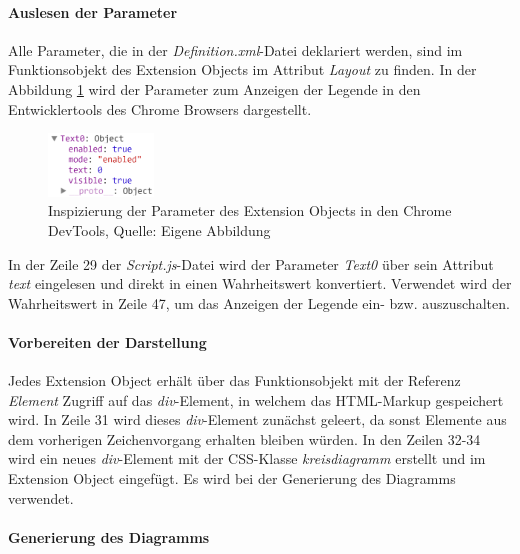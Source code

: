 

\paragraph{Auslesen der Parameter}

Alle Parameter, die in der \textit{Definition.xml}-Datei deklariert werden, sind im Funktionsobjekt des Extension Objects im Attribut \textit{Layout} zu finden. In der Abbildung \ref{fig:InspectLayoutParams} wird der Parameter zum Anzeigen der Legende in den Entwicklertools des Chrome Browsers dargestellt.

\ifIncludeFigures\begin{figure}[htbp]
	\centering
		\includegraphics[width=0.25\textwidth]{./img/DevTools/LayoutParams.png}
	\caption[Inspizierung der Parameter des Extension Objects in den Chrome DevTools]{Inspizierung der Parameter des Extension Objects in den Chrome DevTools, Quelle: Eigene Abbildung}
	\label{fig:InspectLayoutParams}
\end{figure}\fi

In der Zeile 29 der \textit{Script.js}-Datei wird der Parameter \textit{Text0} über sein Attribut \textit{text} eingelesen und direkt in einen Wahrheits\-wert konvertiert. Verwendet wird der Wahrheits\-wert in Zeile 47, um das Anzeigen der Legende ein- bzw. auszuschalten.


\paragraph{Vorbereiten der Darstellung}

Jedes Extension Object erhält über das Funktionsobjekt mit der Referenz \textit{Element} Zugriff auf das \textit{div}-Element, in welchem das HTML-Markup gespeichert wird. In Zeile 31 wird dieses \textit{div}-Element zunächst geleert, da sonst Elemente aus dem vorherigen Zeichenvorgang erhalten bleiben würden. In den Zeilen 32-34 wird ein neues \textit{div}-Element mit der CSS-Klasse \textit{kreisdiagramm} erstellt und im Extension Object eingefügt. Es wird bei der Generierung des Diagramms verwendet.


\paragraph{Generierung des Diagramms}
\label{lab:JsQvGenerierungDesDiagramms} 

